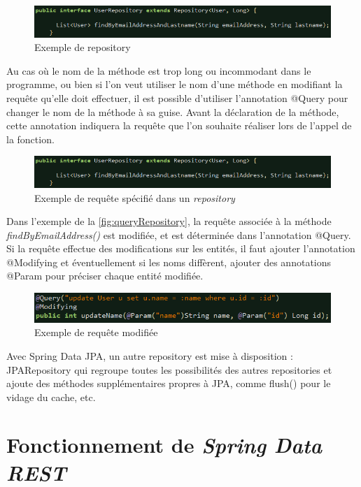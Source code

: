 \documentclass{polytech/polytech}
\begin{document}
\begin{figure}
	\includegraphics[scale=0.8]{images/repositorySpringData}
	\caption{Exemple de repository}
	\label{fig:repositorySpringData}
\end{figure}

Au cas où le nom de la méthode est trop long ou incommodant dans le programme, ou bien si l’on veut utiliser le nom d’une méthode en modifiant la requête qu’elle doit effectuer, il est possible d’utiliser l’annotation @Query pour changer le nom de la méthode à sa guise. Avant la déclaration de la méthode, cette annotation indiquera la requête que l’on souhaite réaliser lors de l’appel de la fonction.

\begin{figure}
	\includegraphics[scale=0.8]{images/repositorySpringData}
	\caption{Exemple de requête spécifié dans un \textit{repository}}
	\label{fig:queryRepository}
\end{figure}

Dans l’exemple de la \autoref{fig:queryRepository}, la requête associée à la méthode \textit{findByEmailAddress()} est modifiée, et est déterminée dans l’annotation @Query. Si la requête effectue des modifications sur les entités, il faut ajouter l’annotation @Modifying et éventuellement si les noms diffèrent, ajouter des annotations @Param pour préciser chaque entité modifiée. 

\begin{figure}
	\includegraphics[scale=0.85]{images/queryModifying}
	\caption{Exemple de requête modifiée}
	\label{fig:queryModifying}
\end{figure}

Avec Spring Data JPA, un autre repository est mise à disposition : JPARepository qui regroupe toutes les possibilités des autres repositories et ajoute des méthodes supplémentaires propres à JPA, comme flush() pour le vidage du cache, etc.

\section{Fonctionnement de \textit{Spring Data REST}}
\end{document}

